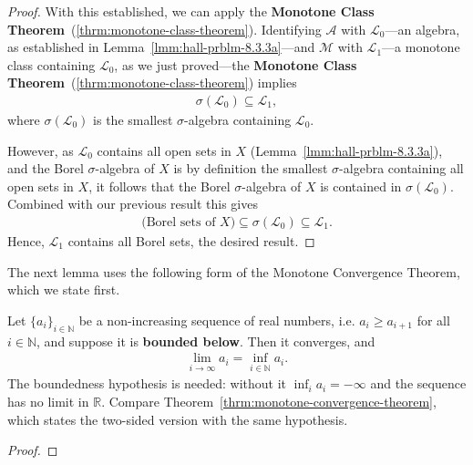 \begin{proof}
With this established, we can apply the \textbf{Monotone Class Theorem}~(\ref{thrm:monotone-class-theorem}). Identifying $\mathcal{A}$ with $\mathcal{L}_0$---an algebra, as established in Lemma~\ref{lmm:hall-prblm-8.3.3a}---and $\mathcal{M}$ with $\mathcal{L}_1$---a monotone class containing $\mathcal{L}_0$, as we just proved---the \textbf{Monotone Class Theorem}~(\ref{thrm:monotone-class-theorem}) implies
\begin{align}
    \sigma(\mathcal{L}_0) \subseteq \mathcal{L}_1,
\end{align}
where $\sigma(\mathcal{L}_0)$ is the smallest $\sigma$-algebra containing $\mathcal{L}_0$.

However, as $\mathcal{L}_0$ contains all open sets in $X$ (Lemma~\ref{lmm:hall-prblm-8.3.3a}), and the Borel $\sigma$-algebra of $X$ is by definition the smallest $\sigma$-algebra containing all open sets in $X$, it follows that the Borel $\sigma$-algebra of $X$ is contained in $\sigma(\mathcal{L}_0)$. Combined with our previous result this gives
\begin{align}
    \text{(Borel sets of } X\text{)} \subseteq \sigma(\mathcal{L}_0) \subseteq \mathcal{L}_1.
\end{align}
Hence, $\mathcal{L}_1$ contains all Borel sets, the desired result.
\end{proof}

The next lemma uses the following form of the Monotone Convergence Theorem, which we state first.

\begin{theorem}
    \label{thrm:monotone-convergence-theorem-nonincreasing}
    \leanok
    Let $\{ a_i \}_{i \in \mathbb{N}}$ be a non-increasing sequence of real numbers, i.e. $a_i \ge a_{i + 1}$ for all $i \in \mathbb{N}$, and suppose it is \textbf{bounded below}. Then it converges, and
    \begin{align}
        \lim\limits_{i \rightarrow \infty} a_i = \inf_{i \in \mathbb{N}} a_i.
    \end{align}
    The boundedness hypothesis is needed: without it $\inf_i a_i = -\infty$ and the sequence has no limit in $\mathbb{R}$. Compare Theorem~\ref{thrm:monotone-convergence-theorem}, which states the two-sided version with the same hypothesis.
\end{theorem}
\begin{proof}
\leanok
\end{proof}

